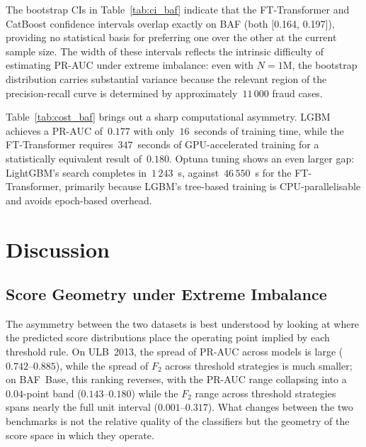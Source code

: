 \documentclass[a4paper,fleqn]{cas-sc}
\begin{document}
The bootstrap CIs in Table~\ref{tab:ci_baf} indicate that the FT-Transformer and
CatBoost confidence intervals overlap exactly on BAF (both [0.164, 0.197]),
providing no statistical basis for preferring one over the other at the current
sample size. The width of these intervals reflects the intrinsic difficulty of
estimating PR-AUC under extreme imbalance: even with $N\!=\!1$M, the bootstrap
distribution carries substantial variance because the relevant region of the
precision-recall curve is determined by approximately~$11\,000$ fraud cases.

Table~\ref{tab:cost_baf} brings out a sharp computational asymmetry. LGBM achieves a
PR-AUC of~$0.177$ with only~$16$~seconds of training time, while the FT-Transformer
requires~$347$~seconds of GPU-accelerated training for a statistically equivalent
result of~$0.180$. Optuna tuning shows an even larger gap: LightGBM's search completes
in~$1\,243$~s, against~$46\,550$~s for the FT-Transformer, primarily because LGBM's
tree-based training is CPU-parallelisable and avoids epoch-based overhead.

\section{Discussion}
\label{sec:discussion}

\subsection{Score Geometry under Extreme Imbalance}
\label{subsec:disc_threshold}

The asymmetry between the two datasets is best understood by looking at where the
predicted score distributions place the operating point implied by each threshold rule.
On ULB~2013, the spread of PR-AUC across models is large
($0.742$--$0.885$), while the spread of $F_2$ across threshold strategies is much
smaller; on BAF~Base, this ranking reverses, with the PR-AUC range collapsing into a
$0.04$-point band ($0.143$--$0.180$) while the $F_2$ range across threshold strategies
spans nearly the full unit interval ($0.001$--$0.317$). What changes between the two
benchmarks is not the relative quality of the classifiers but the geometry of the score
space in which they operate.
\end{document}
